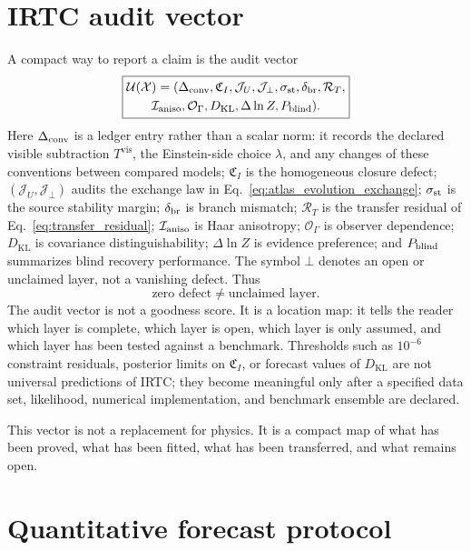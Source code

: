 \documentclass[
  aps,
  prd,
  reprint,
  superscriptaddress,
  floatfix,
  nofootinbib,
  longbibliography
]{revtex4-2}
\theoremstyle{plain}
\theoremstyle{definition}
\theoremstyle{remark}
\newcommand{\vis}{\mathrm{vis}}
\newcommand{\KL}{\operatorname{KL}}
\newcommand{\Ical}{\mathcal I}
\newcommand{\Ocal}{\mathcal O}
\newcommand{\Jcal}{\mathcal J}
\newcommand{\Xcal}{\mathcal X}
\newcommand{\Ucal}{\mathcal U}
\begin{document}
\section{IRTC audit vector}

A compact way to report a claim is the audit vector
\begin{equation}
\boxed{
\begin{gathered}
\Ucal(\Xcal)=
(\Delta_{\rm conv},\mathfrak C_I,\Jcal_U,\Jcal_\perp,
\sigma_{\rm st},\delta_{\rm br},\mathcal R_T,\\
\Ical_{\rm aniso},\Ocal_\Gamma,D_{\KL},
\Delta\ln Z,P_{\rm blind}).
\end{gathered}}
\label{eq:audit_vector}
\end{equation}
Here $\Delta_{\rm conv}$ is a ledger entry rather than a scalar norm: it records the declared visible subtraction $T^{\vis}$, the Einstein-side choice $\lambda$, and any changes of these conventions between compared models; $\mathfrak C_I$ is the homogeneous closure defect; $(\Jcal_U,\Jcal_\perp)$ audits the exchange law in Eq.~\eqref{eq:atlas_evolution_exchange}; $\sigma_{\rm st}$ is the source stability margin; $\delta_{\rm br}$ is branch mismatch; $\mathcal R_T$ is the transfer residual of Eq.~\eqref{eq:transfer_residual}; $\Ical_{\rm aniso}$ is Haar anisotropy; $\Ocal_\Gamma$ is observer dependence; $D_{\KL}$ is covariance distinguishability; $\Delta\ln Z$ is evidence preference; and $P_{\rm blind}$ summarizes blind recovery performance.  The symbol $\bot$ denotes an open or unclaimed layer, not a vanishing defect.  Thus
\begin{equation}
\boxed{\text{zero defect}\ne\text{unclaimed layer}.}
\label{eq:zero_not_open}
\end{equation}
The audit vector is not a goodness score.  It is a location map: it tells the reader which layer is complete, which layer is open, which layer is only assumed, and which layer has been tested against a benchmark.  Thresholds such as $10^{-6}$ constraint residuals, posterior limits on $\mathfrak C_I$, or forecast values of $D_{\KL}$ are not universal predictions of IRTC; they become meaningful only after a specified data set, likelihood, numerical implementation, and benchmark ensemble are declared.

This vector is not a replacement for physics.  It is a compact map of what has been proved, what has been fitted, what has been transferred, and what remains open.


\section{Quantitative forecast protocol}
\label{sec:forecast_protocol}
\end{document}
